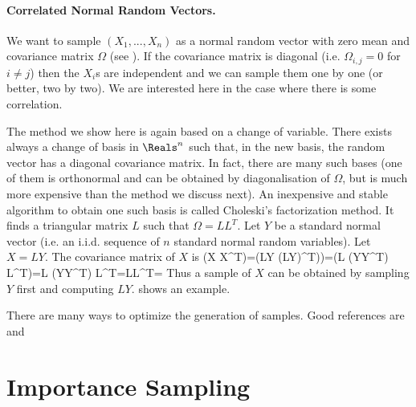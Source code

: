 \paragraph{Correlated Normal Random Vectors. } We want to sample $(X_1,
..., X_n)$ as a normal random vector with zero mean and
covariance matrix $\Omega$ (see ). If the
covariance matrix is diagonal (i.e. $\Omega_{i,j}=0$ for $i\neq
j$) then the $X_i$s are independent and we can sample them one
by one (or better, two by two). We are interested here in the
case where there is some correlation.

The method we show here is again based on a change of variable.
There exists always a change of basis in $\Reals^n$ such that,
in the new basis, the random vector has a diagonal covariance
matrix. In fact, there are many such bases (one of them is
orthonormal and can be obtained by diagonalisation of $\Omega$,
but is much more expensive than the method we discuss next). An
inexpensive and stable algorithm to obtain one such basis is
called Choleski's factorization method. It finds a triangular
matrix $L$ such that $\Omega=L L^T$. Let $Y$ be a standard
normal vector (i.e. an i.i.d. sequence of $n$ standard normal
random variables). Let $X= LY$. The covariance matrix of $X$ is
 \ben
 \E(X X^T)=\E(LY (LY)^T))=\E(L (YY^T) L^T)=L \E(YY^T)
 L^T=LL^T=\Omega
 \een
Thus a sample of $X$ can be obtained by sampling $Y$ first and
computing $LY$.  shows an example.
\begin{figure}[htp]
\begin{center}
\end{center}
\end{figure}

There are many ways to optimize the generation
of samples. Good references are \cite{ycart-2000} and
\cite{ross2006s}


\section{Importance Sampling}
